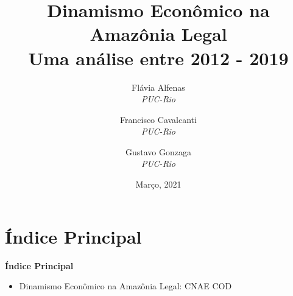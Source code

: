 \documentclass[8pt]{beamer}
\author{
Flávia  Alfenas\\
\textit{PUC-Rio}\\ \vspace{3mm}
\and  
Francisco Cavalcanti\\
\textit{PUC-Rio}\\ \vspace{3mm}
\and   
Gustavo Gonzaga \\
\textit{PUC-Rio} 
}
\date{Março, 2021}
\title{Dinamismo Econômico na Amazônia Legal \\ Uma análise entre 2012 - 2019}
\begin{document}

\begin{frame}
\titlepage
\end{frame}


\section{Índice Principal}

\begin{frame}[label=indice_principal]{}

\textbf{Índice Principal}
\vspace{2mm}
\begin{itemize}

\item{Dinamismo Econômico na Amazônia Legal:  CNAE	\hyperlink{amzcod2dig}{} COD 	\hyperlink{amzcod2dig}{}}
\vspace{2mm}


\end{itemize}
\end{frame}
\end{document}
